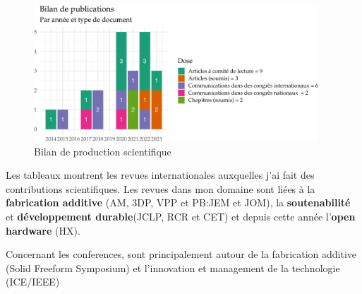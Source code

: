 \documentclass[
  11pt,
]{article}
\begin{document}
\begin{figure}[H]

{\centering \includegraphics[width=0.95\textwidth,height=\textheight]{Figures/fig-bilan-1.pdf}

}

\caption{\label{fig-bilan}Bilan de production scientifique}

\end{figure}

Les tableaux montrent les revues internationales auxquelles j'ai fait
des contributions scientifiques. Les revues dans mon domaine sont liées
à la \textbf{fabrication additive} (AM, 3DP, VPP et PB:JEM et JOM), la
\textbf{soutenabilité} et \textbf{développement durable}(JCLP, RCR et
CET) et depuis cette année l'\textbf{open hardware} (HX).

Concernant les conferences, sont principalement autour de la fabrication
additive (Solid Freeform Symposium) et l'innovation et management de la
technologie (ICE/IEEE)
\end{document}
